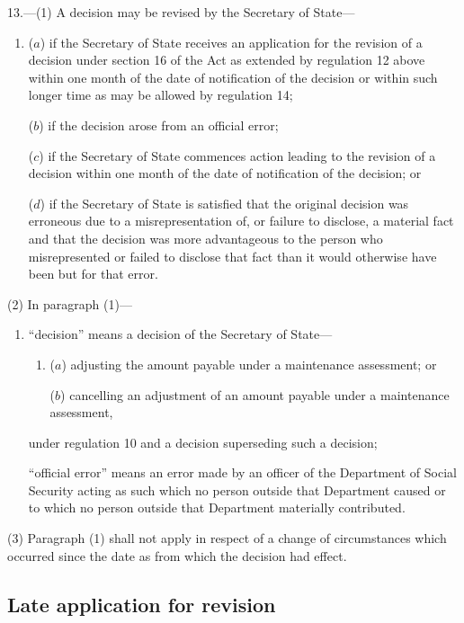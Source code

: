 \documentclass[12pt,a4paper]{article}
\begin{document}
13.—(1) A decision may be revised by the Secretary of State—
\begin{enumerate}\item[]
($a$) if the Secretary of State receives an application for the revision of a decision under section 16 of the Act as extended by regulation 12 above within one month of the date of notification of the decision or within such longer time as may be allowed by regulation 14;

($b$) if the decision arose from an official error;

($c$) if the Secretary of State commences action leading to the revision of a decision within one month of the date of notification of the decision; or

($d$) if the Secretary of State is satisfied that the original decision was erroneous due to a misrepresentation of, or failure to disclose, a material fact and that the decision was more advantageous to the person who misrepresented or failed to disclose that fact than it would otherwise have been but for that error.
\end{enumerate}

(2) In paragraph (1)—
\begin{enumerate}\item[]
    “decision” means a decision of the Secretary of State—
\begin{enumerate}\item[]
    ($a$)
    adjusting the amount payable under a maintenance assessment; or

    ($b$)
    cancelling an adjustment of an amount payable under a maintenance assessment,
\end{enumerate}
    under regulation 10 and a decision superseding such a decision;

    “official error” means an error made by an officer of the Department of Social Security acting as such which no person outside that Department caused or to which no person outside that Department materially contributed. 
\end{enumerate}

(3) Paragraph (1) shall not apply in respect of a change of circumstances which occurred since the date as from which the decision had effect.


\subsection[14. Late application for revision]{Late application for revision}
\end{document}
